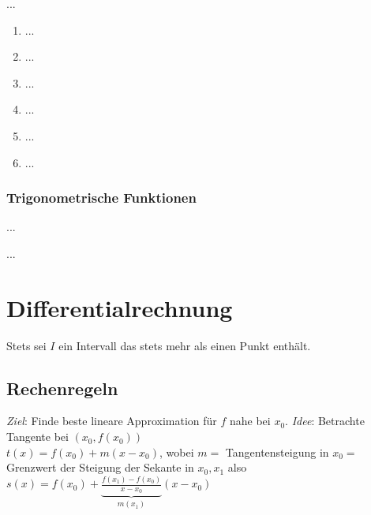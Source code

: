 \documentclass[12pt]{scrreprt}
\begin{document}
\begin{dfn}\label{}

\end{dfn}

\begin{dfn}\label{}

\end{dfn}

\begin{bem}\label{}
...
\begin{enumerate}
\item ...
\item ...
\item ...
\item ...
\item ...
\item ...
\end{enumerate}
\end{bem}

\subsection*{Trigonometrische Funktionen}
...

\begin{satz}\label{}

\end{satz}

\begin{dfn*}

\end{dfn*}

...

\begin{dfn}\label{}

\end{dfn}

\begin{dfn}\label{}

\end{dfn}

\begin{bsp}\label{}

\end{bsp}

\chapter{Differentialrechnung}
\label{cha:diff}
Stets sei $I$ ein Intervall das stets mehr als einen Punkt enthält.
\section{Rechenregeln}
\label{sec:diff.rechenregeln}
\emph{Ziel}: Finde beste lineare Approximation für $f$ nahe bei $x_0$.
\emph{Idee}: Betrachte Tangente bei $(x_0, f(x_0))$\\
$t(x) = f(x_0) + m(x-x_0)$,
wobei $m= $ Tangentensteigung in $x_0 =$ Grenzwert der Steigung der Sekante in $x_0, x_1$ also 
$s(x) = f(x_0) + \underbrace{\frac{f(x_1)-f(x_0)}{x-x_0}}_{m(x_1)} (x-x_0)$
\end{document}
